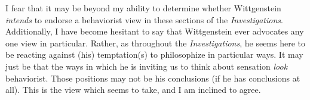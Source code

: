 \documentclass[doc,12pt,apacite,biblatex]{apa6}
\begin{document}
I fear that it may be beyond my ability to determine whether Wittgenstein
\emph{intends} to endorse a behaviorist view in these sections of the
\emph{Investigations}. Additionally, I have become hesitant to say that
Wittgenstein ever advocates any one view in particular.  Rather, as throughout
the \emph{Investigations}, he seems here to be reacting against (his)
temptation(s) to philosophize in particular ways. It may just be that the ways
in which he is inviting us to think about sensation \emph{look} behaviorist.
Those positions may not be his conclusions (if he has conclusions at all). This
is the view which  seems to take, and I am inclined to agree.
\end{document}
